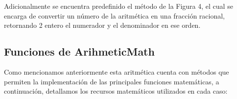\documentclass[a4paper,10pt,twocolumn]{article}
\begin{document}
	Adicionalmente se encuentra predefinido el método de la Figura 4, el cual se encarga de convertir un número de la aritmética en una fracción racional, retornando 2 entero el numerador y el denominador en ese orden.
	
\subsection{Funciones de ArihmeticMath}\label{sub:functions}

	
	Como mencionamos anteriormente esta aritmética cuenta con métodos que permiten la implementación de las principales funciones matemáticas, a continuación, detallamos los recursos matemáticos utilizados en cada caso:
	
\end{document}
